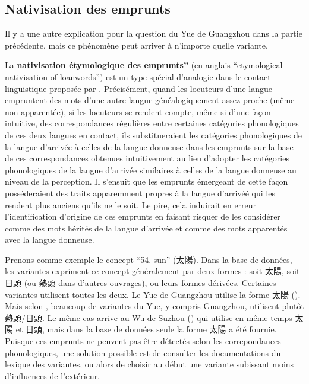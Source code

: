 \documentclass{scrbook}
\newcounter{c}[subsubsection]
\begin{document}
\begin{sloppypar}
\subsection{Nativisation des emprunts}
Il y a une autre explication pour la question du Yue de Guangzhou dans la partie précédente, mais ce phénomène peut arriver à n'importe quelle variante.

La \textbf{nativisation étymologique des emprunts''} (en anglais ``etymological nativisation of loanwords'') est un type spécial d'analogie dans le contact linguistique proposée par \textcite{aikio2007etymological}. Précisément, quand les locuteurs d'une langue empruntent des mots d'une autre langue généalogiquement assez proche (même non apparentée), si les locuteurs se rendent compte, même si d'une façon intuitive, des correspondances régulières entre certaines catégories phonologiques de ces deux langues en contact, ils substitueraient les catégories phonologiques de la langue d'arrivée à celles de la langue donneuse dans les emprunts sur la base de ces correspondances obtenues intuitivement au lieu d'adopter les catégories phonologiques de la langue d'arrivée similaires à celles de la langue donneuse au niveau de la perception. Il s'ensuit que les emprunts émergeant de cette façon posséderaient des traits apparemment propres à la langue d'arrivéé qui les rendent plus anciens qu'ils ne le soit. Le pire, cela induirait en erreur l'identification d'origine de ces emprunts en faisant risquer de les considérer comme des mots hérités de la langue d'arrivée et comme des mots apparentés avec la langue donneuse. 

Prenons comme exemple le concept ``54. sun'' (太陽). Dans la base de données, les variantes expriment ce concept généralement par deux formes : soit 太陽, soit 日頭 (ou 熱頭 dans d'autres ouvrages), ou leurs formes dérivées. Certaines variantes utilisent toutes les deux. Le Yue de Guangzhou utilise la forme 太陽 (\cite[98]{Liu2007hexinci}). Mais selon \textcite[389]{Zhan2002yue}, beaucoup de variantes du Yue, y compris Guangzhou, utilisent plutôt 熱頭/日頭. Le même cas arrive au Wu de Suzhou (\cite[346]{Ye1988suzhou_fangyanzhi}) qui utilise en même temps 太陽 et 日頭, mais dans la base de données seule la forme 太陽 a été fournie. Puisque ces emprunts ne peuvent pas être détectés selon les correpondances phonologiques, une solution possible est de consulter les documentations du lexique des variantes, ou alors de choisir au début une variante subissant moins d'influences de l'extérieur.


\end{sloppypar}
\end{document}
